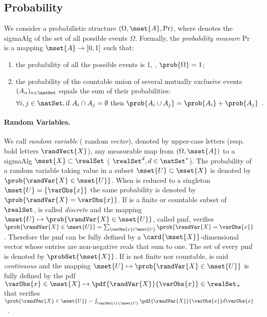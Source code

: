 \subsection{Probability}
\label{sec:probas}
We consider a probabilistic structure \((\Omega, \mset{A}, \mathrm{Pr})\), where  denotes the \gls{sigmaAlg} of the set of all possible events \(\Omega\). 
Formally, the \emph{probability measure} \(\mathrm{Pr}\) is a mapping \(\mset{A} \rightarrow [0,1]\) such that:
\begin{enumerate}
    \item the probability of all the possible events is 1, \ie{}, \(\prob{\Omega} = 1\);
    \item the probability of the countable union of several mutually exclusive events \((A_n)_{n\in\natSet}\) equals the sum of their probabilities:
    \begin{equation}
        \label{eq:prop_2_proba}
        \forall i, j \in \natSet, \mbox{if } A_i \cap A_j = \emptyset \mbox{ then } \prob{A_i \cup A_j} = \prob{A_i} + \prob{A_j} \enspace .
    \end{equation}
\end{enumerate}

\paragraph{Random Variables.}
We call \emph{random variable} (\resp{} random \emph{vector}), denoted by upper-case letters  (resp.~ bold letters \(\randVect{X}\)), any measurable map from \((\Omega, \mset{A})\) to a \gls{sigmaAlg} \(\mset{X}\subset \realSet\) (\resp{} \(\realSet^d, d \in \natSet^*\)).
The probability of a random variable  taking value in a subset \(\mset{U} \subset \mset{X}\) is denoted by \(\prob{\randVar{X} \in \mset{U}}\).
When  is reduced to a singleton \(\mset{U} = \{\varObs{x}\}\) the same probability is denoted by \(\prob{\randVar{X} = \varObs{x}}\).
If  is a \gls{finite} or \gls{countable} subset of \(\realSet\),  is called \emph{discrete} and the mapping \(\mset{U} \mapsto \prob{\randVar{X} \in \mset{U}}\), called \gls{pmf}, verifies \(\prob{\randVar{X} \in \mset{U}} = \sum_{\varObs{x} \in \mset{U}} \prob{\randVar{X} = \varObs{x}}\).
Therefore the \gls{pmf} can be fully defined by a \(\card{\mset{X}}\)-dimensional vector whose entries are non-negative reals that sum to one.
The set of every \gls{pmf} is denoted by \(\probSet{\mset{X}}\).
If  is not finite nor countable,  is said \emph{continuous} and the mapping \(\mset{U} \mapsto \prob{\randVar{X} \in \mset{U}}\) is fully defined by the \gls{pdf} \(\varObs{x} \in \mset{X} \mapsto \pdf{\randVar{X}}{\varObs{x}} \in \realSet_+\) that verifies \(\prob{\randVar{X} \in \mset{U}} = \int_{\varObs{x}\in \mset{U}}\pdf{\randVar{X}}{\varObs{x}} d\varObs{x}\)~\cite[Thm.~1.104]{klenke2013probability}.

